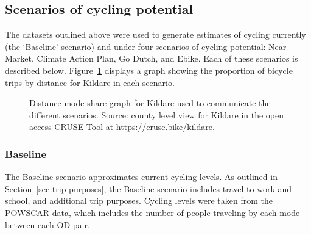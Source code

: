 \documentclass[
  super,
  preprint,
  3p]{elsarticle}
\begin{document}
\subsection{Scenarios of cycling potential}\label{sec-scenarios}

The datasets outlined above were used to generate estimates of cycling
currently (the `Baseline' scenario) and under four scenarios of cycling
potential: Near Market, Climate Action Plan, Go Dutch, and Ebike. Each
of these scenarios is described below. Figure~\ref{fig-scenarios}
displays a graph showing the proportion of bicycle trips by distance for
Kildare in each scenario.

\begin{figure}


\caption{\label{fig-scenarios}Distance-mode share graph for Kildare used
to communicate the different scenarios. Source: county level view for
Kildare in the open access CRUSE Tool at
\url{https://cruse.bike/kildare}.}

\end{figure}%

\subsubsection{Baseline}\label{baseline}

The Baseline scenario approximates current cycling levels. As outlined
in Section~\ref{sec-trip-purposes}, the Baseline scenario includes
travel to work and school, and additional trip purposes. Cycling levels
were taken from the POWSCAR data, which includes the number of people
traveling by each mode between each OD pair.
\end{document}
